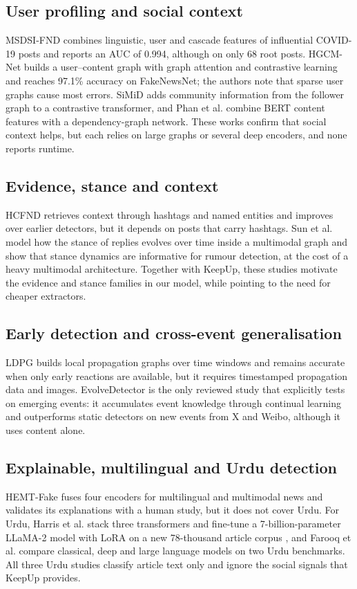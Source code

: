 \documentclass[conference]{IEEEtran}
\begin{document}
\subsection{User profiling and social context}
MSDSI-FND \cite{almutair2025msdsi} combines linguistic, user and cascade features of influential COVID-19 posts
and reports an AUC of 0.994, although on only 68 root posts. HGCM-Net \cite{nivedita2026hgcm} builds a
user--content graph with graph attention and contrastive learning and reaches 97.1\% accuracy on FakeNewsNet;
the authors note that sparse user graphs cause most errors. SiMiD \cite{ozcelik2025simid} adds community
information from the follower graph to a contrastive transformer, and Phan et al. \cite{phan2025context} combine
BERT content features with a dependency-graph network. These works confirm that social context helps, but each
relies on large graphs or several deep encoders, and none reports runtime.

\subsection{Evidence, stance and context}
HCFND \cite{kumar2025hcfnd} retrieves context through hashtags and named entities and improves over earlier
detectors, but it depends on posts that carry hashtags. Sun et al. \cite{sun2025evolving} model how the stance of
replies evolves over time inside a multimodal graph and show that stance dynamics are informative for rumour
detection, at the cost of a heavy multimodal architecture. Together with KeepUp, these studies motivate the
evidence and stance families in our model, while pointing to the need for cheaper extractors.

\subsection{Early detection and cross-event generalisation}
LDPG \cite{ji2026ldpg} builds local propagation graphs over time windows and remains accurate when only early
reactions are available, but it requires timestamped propagation data and images. EvolveDetector
\cite{ding2025evolvedetector} is the only reviewed study that explicitly tests on emerging events: it
accumulates event knowledge through continual learning and outperforms static detectors on new events from X
and Weibo, although it uses content alone.

\subsection{Explainable, multilingual and Urdu detection}
HEMT-Fake \cite{jadhav2025hemtfake} fuses four encoders for multilingual and multimodal news and validates its
explanations with a human study, but it does not cover Urdu. For Urdu, Harris et al. stack three transformers
\cite{harris2025urduensemble} and fine-tune a 7-billion-parameter LLaMA-2 model with LoRA on a new 78-thousand
article corpus \cite{harris2025hookbait}, and Farooq et al. \cite{farooq2025urdu} compare classical, deep and
large language models on two Urdu benchmarks. All three Urdu studies classify article text only and ignore the
social signals that KeepUp provides.
\end{document}
